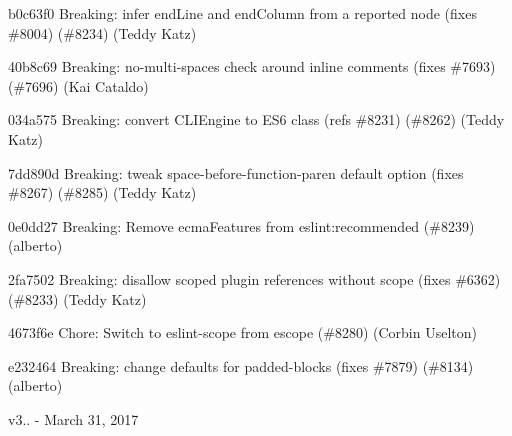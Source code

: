 \begin{DoxyItemize}
\item b0c63f0 Breaking\+: infer end\+Line and end\+Column from a reported node (fixes \#8004) (\#8234) (Teddy Katz)
\item 40b8c69 Breaking\+: no-\/multi-\/spaces check around inline comments (fixes \#7693) (\#7696) (Kai Cataldo)
\item 034a575 Breaking\+: convert CLIEngine to ES6 class (refs \#8231) (\#8262) (Teddy Katz)
\item 7dd890d Breaking\+: tweak space-\/before-\/function-\/paren default option (fixes \#8267) (\#8285) (Teddy Katz)
\item 0e0dd27 Breaking\+: Remove {\ttfamily ecma\+Features} from {\ttfamily eslint\+:recommended} (\#8239) (alberto)
\item 2fa7502 Breaking\+: disallow scoped plugin references without scope (fixes \#6362) (\#8233) (Teddy Katz)
\item 4673f6e Chore\+: Switch to eslint-\/scope from escope (\#8280) (Corbin Uselton)
\item e232464 Breaking\+: change defaults for padded-\/blocks (fixes \#7879) (\#8134) (alberto)
\end{DoxyItemize}

v3.. -\/ March 31, 2017


